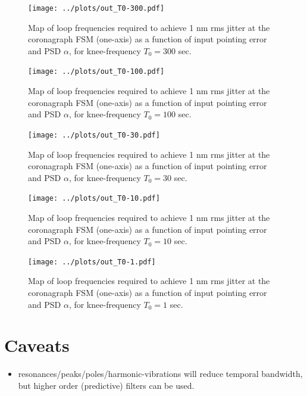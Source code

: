\documentclass[10pt,preprint]{aastex631}
\begin{document}
\begin{figure}
\centering
\texttt{[image: ../plots/out\_T0-300.pdf]}
\caption{Map of loop frequencies required to achieve 1 nm rms jitter at the coronagraph FSM (one-axis) as a function of input pointing error and PSD $\alpha$, for knee-frequency $T_0 = 300$ sec.  \label{fig:T0-300}}
\end{figure}

\begin{figure}
\centering
\texttt{[image: ../plots/out\_T0-100.pdf]}
\caption{Map of loop frequencies required to achieve 1 nm rms jitter at the coronagraph FSM (one-axis) as a function of input pointing error and PSD $\alpha$, for knee-frequency $T_0 = 100$ sec.  \label{fig:T0-100}}
\end{figure}

\begin{figure}
\centering
\texttt{[image: ../plots/out\_T0-30.pdf]}
\caption{Map of loop frequencies required to achieve 1 nm rms jitter at the coronagraph FSM (one-axis) as a function of input pointing error and PSD $\alpha$, for knee-frequency $T_0 = 30$ sec.  \label{fig:T0-30}}
\end{figure}

\begin{figure}
\centering
\texttt{[image: ../plots/out\_T0-10.pdf]}
\caption{Map of loop frequencies required to achieve 1 nm rms jitter at the coronagraph FSM (one-axis) as a function of input pointing error and PSD $\alpha$, for knee-frequency $T_0 = 10$ sec.  \label{fig:T0-10}}
\end{figure}

\begin{figure}
\centering
\texttt{[image: ../plots/out\_T0-1.pdf]}
\caption{Map of loop frequencies required to achieve 1 nm rms jitter at the coronagraph FSM (one-axis) as a function of input pointing error and PSD $\alpha$, for knee-frequency $T_0 = 1$ sec.  \label{fig:T0-1}}
\end{figure}


\section{Caveats}

\begin{itemize}
\item resonances/peaks/poles/harmonic-vibrations will reduce temporal bandwidth, but higher order (predictive) filters can be used.  \\
\end{itemize}




\end{document}
